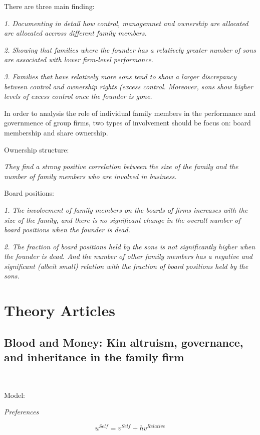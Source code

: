 \documentclass{article}
\begin{document}
    There are three main finding:
    
    \emph{1. Documenting in detail how control, managemnet and ownership are allocated 
    are allocated accross different family members. }

    \emph{2. Showing that families where the founder has a relatively greater number of sons are associated with lower firm-level performance.}

    \emph{3. Families that have relatively more sons tend to show a larger discrepancy between control and ownership rights (excess control.
    Moreover, sons show higher levels of excess control once the founder is gone. }

    In order to analysis the role of individual family members in the performance and 
    governmence of group firms, two types of involvement should be focus on: board membership and share ownership.
    
    Ownership structure: 
    
    \emph{They find a strong positive correlation between the size of the family and the number of family members who are involved in business. }

    Board positions: 

    \emph{1. The involvement of family members on the boards of firms increases with the size of the family, 
    and there is no significant change in the overall number of board positions when the founder is dead. }

    \emph{2. The fraction of board positions held by the sons is not significantly higher when the founder is dead.
    And the number of other family members has a negative and significant (albeit small) relation with the fraction of 
    board positions held by the sons. }

\section{Theory Articles}
\subsection{Blood and Money: Kin altruism, governance, and inheritance in the family firm}
    ~\

    Model:
    
    \emph{Preferences}

    \begin{equation}
        u^{Self}=v^{Self}+hv^{Relative}
    \end{equation}
\end{document}
